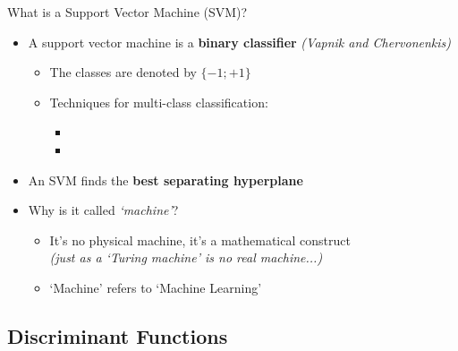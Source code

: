 \begin{frame}{What is a Support Vector Machine (SVM)?}{}
	\begin{itemize}
		\item A support vector machine is a \textbf{binary classifier}
			{\footnotesize \textit{(Vapnik and Chervonenkis)}}
		\begin{itemize}
			\item The classes are denoted by $\{-1; +1\}$
			\item Techniques for multi-class classification:
			\begin{itemize}
				\item {}
				\item {}
			\end{itemize}
		\end{itemize}
		\item An SVM finds the \textbf{best separating hyperplane}
		\item Why is it called \textit{`machine'}?
		\begin{itemize}
			\item It's no physical machine, it's a mathematical construct \\
				{\footnotesize \textit{(just as a `Turing machine' is no real machine...)}}
			\item `Machine' refers to `Machine Learning' 
		\end{itemize}
	\end{itemize}
\end{frame}


\subsection{Discriminant Functions}

